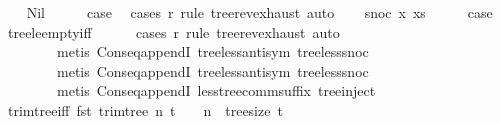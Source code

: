 \begin{isabellebody}
\ \ \isamarkupfalse%
\ Nil\isanewline
\ \ \isamarkupfalse%
\ \isamarkupfalse%
\ {\isacharquery}{\kern0pt}case\ \isamarkupfalse%
\ {\isacharparenleft}{\kern0pt}cases\ r\ rule{\isacharcolon}{\kern0pt}\ tree{\isacharunderscore}{\kern0pt}rev{\isacharunderscore}{\kern0pt}exhaust{\isacharparenright}{\kern0pt}\ auto\isanewline
{}\isamarkupfalse%
\isanewline
\ \ \isamarkupfalse%
\ {\isacharparenleft}{\kern0pt}snoc\ x\ xs{\isacharparenright}{\kern0pt}\isanewline
\ \ \isamarkupfalse%
\ \isamarkupfalse%
\ {\isacharquery}{\kern0pt}case\ \isamarkupfalse%
\ tree{\isacharunderscore}{\kern0pt}le{\isacharunderscore}{\kern0pt}empty{}{\isacharunderscore}{\kern0pt}iff\isanewline
\ \ \ \ \isamarkupfalse%
\ {\isacharparenleft}{\kern0pt}cases\ r\ rule{\isacharcolon}{\kern0pt}\ tree{\isacharunderscore}{\kern0pt}rev{\isacharunderscore}{\kern0pt}exhaust{\isacharcomma}{\kern0pt}\ auto{\isacharcomma}{\kern0pt}\isanewline
\ \ \ \ \ \ \ \ metis\ Cons{\isacharunderscore}{\kern0pt}eq{\isacharunderscore}{\kern0pt}appendI\ tree{\isacharunderscore}{\kern0pt}less{\isacharunderscore}{\kern0pt}antisym\ tree{\isacharunderscore}{\kern0pt}less{\isacharunderscore}{\kern0pt}snoc{}{\isacharcomma}{\kern0pt}\isanewline
\ \ \ \ \ \ \ \ metis\ Cons{\isacharunderscore}{\kern0pt}eq{\isacharunderscore}{\kern0pt}appendI\ tree{\isacharunderscore}{\kern0pt}less{\isacharunderscore}{\kern0pt}antisym\ tree{\isacharunderscore}{\kern0pt}less{\isacharunderscore}{\kern0pt}snoc{}{\isacharcomma}{\kern0pt}\isanewline
\ \ \ \ \ \ \ \ metis\ Cons{\isacharunderscore}{\kern0pt}eq{\isacharunderscore}{\kern0pt}appendI\ less{\isacharunderscore}{\kern0pt}tree{\isacharunderscore}{\kern0pt}comm{\isacharunderscore}{\kern0pt}suffix\ tree{\isachardot}{\kern0pt}inject{\isacharparenright}{\kern0pt}\isanewline
{}\isamarkupfalse%
%
\endisatagproof
{\isafoldproof}%
%
\isadelimproof
\isanewline
%
\endisadelimproof
\isanewline
{}\isamarkupfalse%
\ trim{\isacharunderscore}{\kern0pt}tree{\isacharunderscore}{\kern0pt}{}{\isacharunderscore}{\kern0pt}iff{\isacharcolon}{\kern0pt}\ {\isachardoublequoteopen}fst\ {\isacharparenleft}{\kern0pt}trim{\isacharunderscore}{\kern0pt}tree\ n\ t{\isacharparenright}{\kern0pt}\ {\isacharequal}{\kern0pt}\ {}\ {\isasymlongleftrightarrow}\ n\ {\isasymle}\ tree{\isacharunderscore}{\kern0pt}size\ t{\isachardoublequoteclose}\isanewline
%
\isadelimproof
\ \ %
\endisadelimproof

\end{isabellebody}
